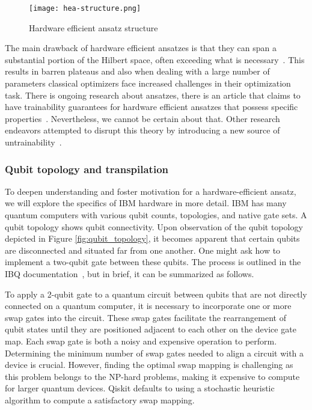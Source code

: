 \begin{figure}[H]
    \centering
    \texttt{[image: hea-structure.png]}       
    \caption{Hardware efficient ansatz structure~\cite{img:hea}}     
\end{figure}
The main drawback of hardware efficient ansatzes is that they can span a substantial portion of the Hilbert space, often exceeding what is necessary~\cite{holmes2022}. This results in barren plateaus and also when dealing with a large number of parameters classical optimizers face increased challenges in their optimization task. There is ongoing research about ansatzes, there is an article that claims to have trainability guarantees for hardware efficient ansatzes that possess specific properties~\cite{shallow}. Nevertheless, we cannot be certain about that. Other research endeavors attempted to disrupt this theory by introducing a new source of untrainability~\cite{hea-practical}.

\subsubsection{Qubit topology and transpilation}
To deepen understanding and foster motivation for a hardware-efficient ansatz, we will explore the specifics of IBM hardware in more detail. IBM has many quantum computers with various qubit counts, topologies, and native gate sets. A qubit topology shows qubit connectivity. Upon observation of the qubit topology depicted in Figure \ref{fig:qubit_topology}, it becomes apparent that certain qubits are disconnected and situated far from one another. One might ask how to implement a two-qubit gate between these qubits. The process is outlined in the IBQ documentation~\cite{transpiler,native_gates}, but in brief, it can be summarized as follows.

To apply a 2-qubit gate to a quantum circuit between qubits that are not directly connected on a quantum computer, it is necessary to incorporate one or more swap gates into the circuit. These swap gates facilitate the rearrangement of qubit states until they are positioned adjacent to each other on the device gate map. Each swap gate is both a noisy and expensive operation to perform. Determining the minimum number of swap gates needed to align a circuit with a device is crucial. However, finding the optimal swap mapping is challenging as this problem belongs to the NP-hard problems, making it expensive to compute for larger quantum devices. Qiskit defaults to using a stochastic heuristic algorithm to compute a satisfactory swap mapping.

